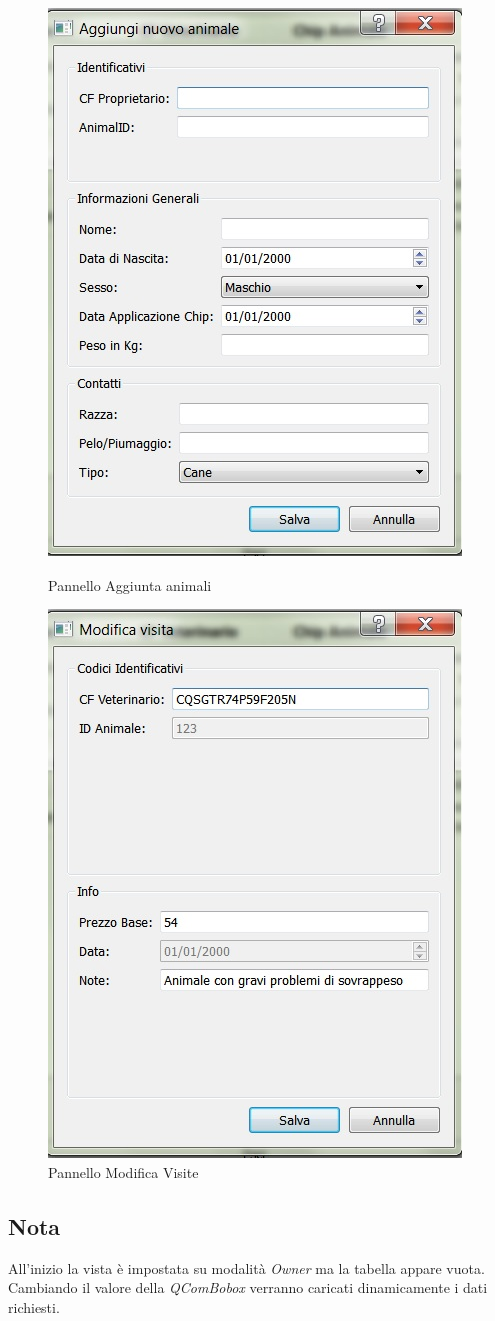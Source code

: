\begin{figure}
	\centering
	\begin{minipage}{0.45\textwidth}
		\centering
		\includegraphics[width=.5\linewidth]{images/addAnimal_view.jpg}
		\caption{Pannello Aggiunta animali}
	\end{minipage}\hfill
	\begin{minipage}{0.45\textwidth}
		\centering
		\includegraphics[width=.5\linewidth]{images/editvisit_view.jpg}
		\caption{Pannello Modifica Visite}
	\end{minipage}
\end{figure}

\subsection{Nota}
All'inizio la vista è impostata su modalità \textit{Owner} ma la tabella appare vuota. Cambiando il valore della \textit{QComBobox} verranno caricati dinamicamente i dati richiesti.

